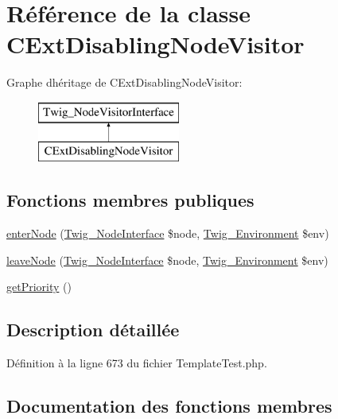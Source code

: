 \hypertarget{class_c_ext_disabling_node_visitor}{}\section{Référence de la classe C\+Ext\+Disabling\+Node\+Visitor}
\label{class_c_ext_disabling_node_visitor}
Graphe d\textquotesingle{}héritage de C\+Ext\+Disabling\+Node\+Visitor\+:\begin{figure}[H]
\begin{center}
\leavevmode
\includegraphics[height=2.000000cm]{class_c_ext_disabling_node_visitor}
\end{center}
\end{figure}
\subsection*{Fonctions membres publiques}
\begin{DoxyCompactItemize}
\item 
\hyperlink{class_c_ext_disabling_node_visitor_ad3bfee38f2bc56df9500da7f20b6e13a}{enter\+Node} (\hyperlink{interface_twig___node_interface}{Twig\+\_\+\+Node\+Interface} \$node, \hyperlink{class_twig___environment}{Twig\+\_\+\+Environment} \$env)
\item 
\hyperlink{class_c_ext_disabling_node_visitor_a436bb1ae16511148e860e5cfa2cad88f}{leave\+Node} (\hyperlink{interface_twig___node_interface}{Twig\+\_\+\+Node\+Interface} \$node, \hyperlink{class_twig___environment}{Twig\+\_\+\+Environment} \$env)
\item 
\hyperlink{class_c_ext_disabling_node_visitor_a1e7a3c168dcd0901a0d2669c67575b55}{get\+Priority} ()
\end{DoxyCompactItemize}


\subsection{Description détaillée}


Définition à la ligne 673 du fichier Template\+Test.\+php.



\subsection{Documentation des fonctions membres}
